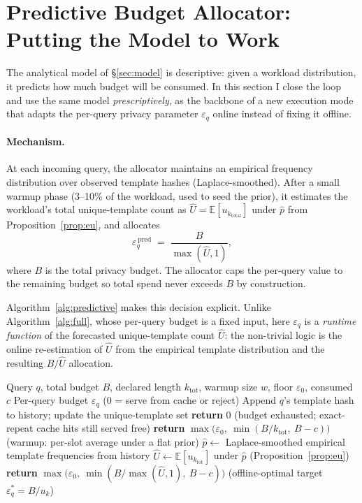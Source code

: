 \documentclass[sigconf,nonacm]{acmart}
\newcommand{\eps}{\varepsilon}
\newcommand{\E}{\mathbb{E}}
\begin{document}
\section{Predictive Budget Allocator: Putting the Model to Work}
\label{sec:predictive}

The analytical model of §\ref{sec:model} is descriptive: given a workload distribution, it predicts how much budget will be consumed. In this section I close the loop and use the same model \emph{prescriptively}, as the backbone of a new execution mode that adapts the per-query privacy parameter $\eps_q$ online instead of fixing it offline.

\paragraph{Mechanism.}
At each incoming query, the allocator maintains an empirical frequency distribution over observed template hashes (Laplace-smoothed). After a small warmup phase (3--10\% of the workload, used to seed the prior), it estimates the workload's total unique-template count as $\hat U = \E[u_{k_{\mathrm{total}}}]$ under $\hat p$ from Proposition~\ref{prop:eu}, and allocates
\[
\eps_q^{\,\mathrm{pred}} \;=\; \frac{B}{\max(\hat U, 1)},
\]
where $B$ is the total privacy budget. The allocator caps the per-query value to the remaining budget so total spend never exceeds $B$ by construction.

Algorithm~\ref{alg:predictive} makes this decision explicit. Unlike Algorithm~\ref{alg:full}, whose per-query budget is a fixed input, here $\eps_q$ is a \emph{runtime function} of the forecasted unique-template count $\hat U$: the non-trivial logic is the online re-estimation of $\hat U$ from the empirical template distribution and the resulting $B/\hat U$ allocation.

\begin{algorithm}[h]
\caption{Predictive per-query budget allocation}
\label{alg:predictive}
\begin{algorithmic}[1]
\REQUIRE Query $q$, total budget $B$, declared length $k_{\mathrm{tot}}$, warmup size $w$, floor $\eps_0$, consumed $c$
\ENSURE Per-query budget $\eps_q$ (0 = serve from cache or reject)
\STATE Append $q$'s template hash to history; update the unique-template set
\IF{$B - c \leq \eps_0$}
    \STATE \textbf{return} $0$ \hfill {\small (budget exhausted; exact-repeat cache hits still served free)}
\ENDIF
{}
    \STATE \textbf{return} $\max\!\big(\eps_0,\ \min(B/k_{\mathrm{tot}},\ B-c)\big)$ \hfill {\small (warmup: per-slot average under a flat prior)}
\ENDIF
\STATE $\hat p \gets$ Laplace-smoothed empirical template frequencies from history
\STATE $\hat U \gets \E[u_{k_{\mathrm{tot}}}]$ under $\hat p$ \hfill {\small (Proposition~\ref{prop:eu})}
\STATE \textbf{return} $\max\!\big(\eps_0,\ \min(B/\max(\hat U,1),\ B-c)\big)$ \hfill {\small (offline-optimal target $\eps_q^*=B/u_k$)}
\end{algorithmic}
\end{algorithm}
\end{document}
